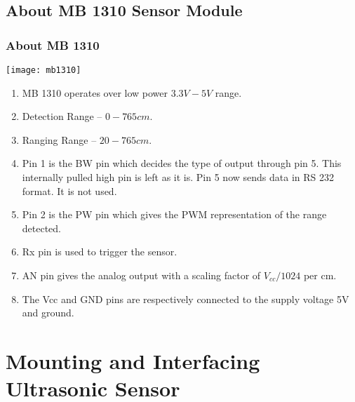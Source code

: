 \documentclass[table,10pt,red]{beamer}	%
\begin{document}
\subsection{About MB 1310 Sensor Module} %
\begin{frame}
	\frametitle{About MB 1310}
	\begin{minipage}[c]{0.2\textwidth}
				\texttt{[image: mb1310]}
			\end{minipage}
		\pause
		\hfill
			\begin{minipage}[c]{0.75\textwidth}
				\begin{enumerate}
					\item <+-|alert@+> \small MB 1310 operates over low power $3.3V-5V$ range. 
					\item <+-|alert@+> Detection Range – $0 - 765cm$.
					\item <+-|alert@+> Ranging Range – $20 - 765cm$.
					\item <+-|alert@+> Pin 1 is the BW pin which decides the type of output through pin 5. This internally pulled high pin is left as it is. Pin 5 now sends data in RS 232 format. It is not used.
					\item <+-|alert@+> Pin 2 is the PW pin which gives the PWM representation of the range detected.
					\item <+-|alert@+> Rx pin is used to trigger the sensor.
					\item <+-|alert@+> AN pin gives the analog output with a scaling factor of $V_{cc}/1024$ per cm.
					\item <+-|alert@+> The Vcc and GND pins are respectively connected to the supply voltage 5V and ground.
					
				
					
				\end{enumerate}
			\end{minipage}   

\end{frame}






\section{Mounting and Interfacing Ultrasonic Sensor} %
\end{document}
